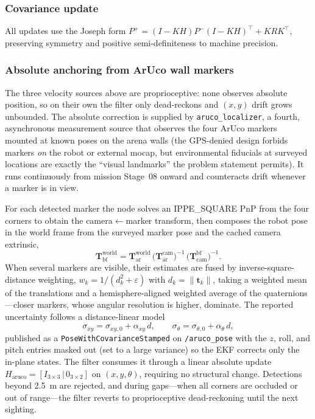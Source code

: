 \documentclass[conference]{IEEEtran}
\newcommand{\subsys}[1]{\texttt{#1}}      %
\newcommand{\Tmat}{\mathbf{T}}
\begin{document}
\subsubsection{Covariance update}
All updates use the Joseph form
$P^+=(I-KH)P^-(I-KH)^\top+KRK^\top$, preserving symmetry and positive
semi-definiteness to machine precision.

\subsubsection{Absolute anchoring from ArUco wall markers}
\label{sec:ekf-aruco}
The three velocity sources above are proprioceptive: none observes absolute
position, so on their own the filter only dead-reckons and $(x,y)$ drift grows
unbounded. The absolute correction is supplied by \subsys{aruco\_localizer}, a
fourth, asynchronous measurement source that observes the four ArUco markers
mounted at known poses on the arena walls (the GPS-denied design forbids markers
\emph{on} the robot or external mocap, but environmental fiducials at surveyed
locations are exactly the ``visual landmarks'' the problem statement permits). It
runs continuously from mission Stage~08 onward and counteracts drift whenever a
marker is in view.

For each detected marker the node solves an IPPE\_SQUARE PnP from the four
corners to obtain the camera$\leftarrow$marker transform, then composes the
robot pose in the world frame from the surveyed marker pose and the cached
camera extrinsic,
\begin{equation}
\Tmat_{\text{bf}}^{\text{world}}=
\Tmat_{\text{ar}}^{\text{world}}\,
\big(\Tmat_{\text{ar}}^{\text{cam}}\big)^{-1}\,
\big(\Tmat_{\text{cam}}^{\text{bf}}\big)^{-1}.
\end{equation}
When several markers are visible, their estimates are fused by
inverse-square-distance weighting, $w_k=1/(d_k^2+\varepsilon)$ with
$d_k=\lVert\mathbf{t}_k\rVert$, taking a weighted mean of the translations and a
hemisphere-aligned weighted average of the quaternions---closer markers, whose
angular resolution is higher, dominate. The reported uncertainty follows a
distance-linear model
\begin{equation}
\sigma_{xy}=\sigma_{xy,0}+\alpha_{xy}\,d,\qquad
\sigma_{\theta}=\sigma_{\theta,0}+\alpha_{\theta}\,d,
\end{equation}
published as a \texttt{PoseWithCovarianceStamped} on \texttt{/aruco\_pose} with
the $z$, roll, and pitch entries masked out (set to a large variance) so the EKF
corrects only the in-plane states. The filter consumes it through a linear
absolute update $H_\text{aruco}=[I_{3\times3}\,|\,0_{3\times2}]$ on $(x,y,\theta)$,
requiring no structural change. Detections beyond \SI{2.5}{\meter} are rejected,
and during gaps---when all corners are occluded or out of range---the filter
reverts to proprioceptive dead-reckoning until the next sighting.
\end{document}
